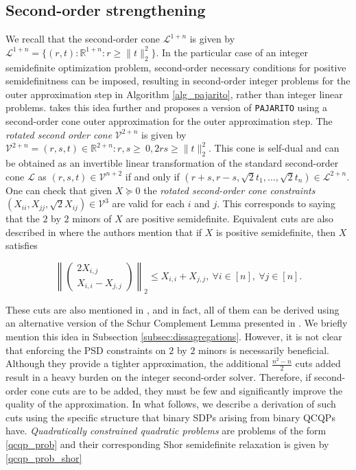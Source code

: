\documentclass{article}
\begin{document}
\subsection{Second-order strengthening}


We recall that the second-order cone $\mathcal{L}^{1+n}$ is given by $
\mathcal{L}^{1+n} = \{(r,t):\mathbb{R}^{1+n}:r \geq \|t\|^2_2\}.
$
In the particular case of an integer semidefinite optimization problem, second-order necessary conditions for positive semidefinitness can be imposed, resulting in second-order integer problems for the outer approximation step in Algorithm \ref{alg_pajarito}, rather than integer linear problems.
\cite{coey2020outer} takes this idea further and proposes a version of \texttt{PAJARITO} using a second-order cone outer approximation for the outer approximation step. The \emph{rotated second order cone} $\mathcal{V}^{2+n}$ is given by $
\mathcal{V}^{2+n} = (r,s,t) \in \mathbb{R}^{2+n}: r,s\geq \ 0, 2rs \geq \|t\|_2^2. 
$
This cone is self-dual and can be obtained as an invertible linear transformation of the standard second-order cone $\mathcal{L}$ as $(r,s,t) \in \mathcal{V}^{n+2}$ if and only if $(r+s,r-s,\sqrt{2}t_1,\dots, \sqrt{2}t_n ) \in \mathcal{L}^{2+n}$. One can check that given $X\succeq 0$ the \emph{rotated second-order cone constraints}
$
(X_{ii},X_{jj}, \sqrt{2}X_{ij}) \in \mathcal{V}^3 
$
are valid for each $i$ and $j$. This corresponds to saying that the $2 $ by $2$ minors of $X$ are positive semidefinite. 
Equivalent cuts are also described in  \cite{bertsimas2020polyhedral} where the authors mention that if $X$ is positive semidefinite, then $X$ satisfies

\begin{equation}\label{eq:soc_cuts}
\left\| \begin{pmatrix}2X_{i,j} \\ X_{i,i}-X_{j,j} \end{pmatrix} \right\|_2 \leq X_{i,i}+X_{j,j}, \ \forall i \in [n], \  \forall j \in [n].
\end{equation}

These cuts are also mentioned in \cite{wang2021polyhedral}, and
in fact, all of them can be derived using an alternative version of the Schur Complement Lemma presented in \cite{kim2003second}. We briefly mention this idea in Subsection \ref{subsec:dissagregations}. 
However, it is not clear that enforcing the PSD constraints on $2$ by $2$ minors is necessarily beneficial. Although they provide a tighter approximation, the additional $\frac{n^2-n}{2}$ cuts added result in a heavy burden on the integer second-order solver. Therefore, if second-order cone cuts are to be added, they must be few and significantly improve the quality of the approximation. In what follows, we describe a derivation of such cuts using the specific structure that binary SDPs arising from binary QCQPs have. \emph{Quadratically constrained quadratic problems} are problems of the form \ref{qcqp_prob} and their corresponding Shor semidefinite relaxation is given by \eqref{qcqp_prob_shor}
\end{document}

